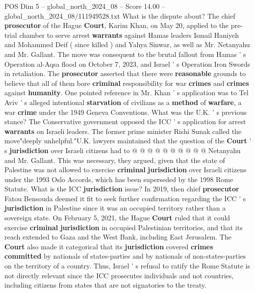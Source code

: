 \begin{textsample}{POS Dim 5 – global\_north\_2024\_08 – Score 14.00 – global\_north\_2024\_08/111949528.txt}  \label{ex:f5_pos_372}
What is the dispute about?
The chief \textbf{prosecutor} of the Hague \textbf{Court}, Karim Khan, on May 20, applied to the pre-trial chamber to serve arrest \textbf{warrants} against Hamas leaders Ismail Haniyeh and Mohammed Deif ( since killed ) and Yahya Sinwar, as well as Mr.
Netanyahu and Mr.
Gallant.
The move was consequent to the brutal fallout from Hamas ' s Operation al-Aqsa flood on October 7, 2023, and Israel ' s Operation Iron Swords in retaliation.
The \textbf{prosecutor} asserted that there were \textbf{reasonable} grounds to believe that all of them bore \textbf{criminal} responsibility for war \textbf{crimes} and \textbf{crimes} against \textbf{humanity}.
One pointed reference in Mr.
Khan ' s application was to Tel Aviv ' s alleged intentional \textbf{starvation} of civilians as a \textbf{method} of \textbf{warfare}, a war \textbf{crime} under the 1949 Geneva Conventions.
What was the U.K. ' s previous stance?
The Conservative government opposed the ICC ' s application for arrest \textbf{warrants} on Israeli leaders.
The former prime minister Rishi Sunak called the move"deeply unhelpful."U.K. lawyers maintained that the question of the \textbf{Court} ' s \textbf{jurisdiction} over Israeli citizens had to @ @ @ @ @ @ @ @ @ @ Netanyahu and Mr.
Gallant.
This was necessary, they argued, given that the state of Palestine was not allowed to exercise \textbf{criminal} \textbf{jurisdiction} over Israeli citizens under the 1993 Oslo Accords, which has been superseded by the 1998 Rome Statute.
What is the ICC \textbf{jurisdiction} issue?
In 2019, then chief \textbf{prosecutor} Fatou Bensouda deemed it fit to seek further confirmation regarding the ICC ' s \textbf{jurisdiction} in Palestine since it was an occupied territory rather than a sovereign state.
On February 5, 2021, the Hague \textbf{Court} ruled that it could exercise \textbf{criminal} \textbf{jurisdiction} in occupied Palestinian territories, and that its reach extended to Gaza and the West Bank, including East Jerusalem.
The \textbf{Court} also made it categorical that its \textbf{jurisdiction} covered \textbf{crimes} \textbf{committed} by nationals of states-parties and by nationals of non-states-parties on the territory of a country.
Thus, Israel ' s refusal to ratify the Rome Statute is not directly relevant since the ICC prosecutes individuals and not countries, including citizens from states that are not signatories to the treaty.

\end{textsample}
